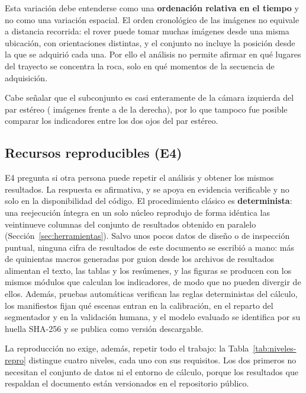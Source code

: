 Esta variación debe entenderse como una \textbf{ordenación relativa en el tiempo} y no como
una variación espacial. El orden cronológico de las imágenes no equivale a distancia recorrida:
el rover puede tomar muchas imágenes desde una misma ubicación, con orientaciones distintas, y
el conjunto no incluye la posición desde la que se adquirió cada una. Por ello el análisis no
permite afirmar en qué lugares del trayecto se concentra la roca, solo en qué momentos de la
secuencia de adquisición.

Cabe señalar que el subconjunto es casi enteramente de la cámara izquierda del par estéreo
(\cNOjoIzq{} imágenes frente a \cNOjoDer{} de la derecha), por lo que tampoco fue posible
comparar los indicadores entre los dos ojos del par estéreo.

\subsection{Recursos reproducibles (E4)}
\label{sec:e4}

E4 pregunta si otra persona puede repetir el análisis y obtener los mismos resultados. La
respuesta es afirmativa, y se apoya en evidencia verificable y no solo en la disponibilidad del
código. El procedimiento clásico es \textbf{determinista}: una reejecución íntegra en un solo
núcleo reprodujo de forma idéntica las veintinueve columnas del conjunto de resultados obtenido
en paralelo (Sección~\ref{sec:herramientas}). Salvo unos pocos datos de diseño o de inspección
puntual, ninguna cifra de resultados de este documento se escribió a mano: más de quinientas macros generadas por guion desde los archivos de resultados
alimentan el texto, las tablas y los resúmenes, y las figuras se producen con los mismos
módulos que calculan los indicadores, de modo que no pueden divergir de ellos. Además,
\cPruebasN{} pruebas automáticas verifican las reglas deterministas del cálculo, los manifiestos fijan qué
escenas entran en la calibración, en el reparto del segmentador y en la validación humana, y el
modelo evaluado se identifica por su huella SHA-256 y se publica como versión descargable.

La reproducción no exige, además, repetir todo el trabajo: la Tabla~\ref{tab:niveles-repro}
distingue cuatro niveles, cada uno con sus requisitos. Los dos primeros no necesitan el conjunto
de datos ni el entorno de cálculo, porque los resultados que respaldan el documento están
versionados en el repositorio público.

